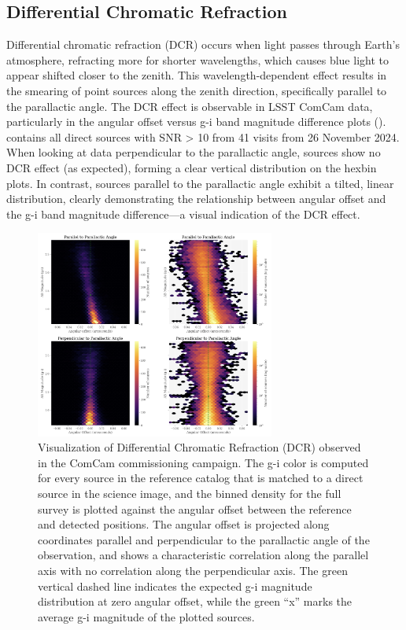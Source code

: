 \subsection{Differential Chromatic Refraction}
\label{sec:diffeerential_chromatic_refraction}

Differential chromatic refraction (DCR) occurs when light passes through Earth’s atmosphere, refracting more for shorter wavelengths, which causes blue light to appear shifted closer to the zenith. This wavelength-dependent effect results in the smearing of point sources along the zenith direction, specifically parallel to the parallactic angle. The DCR effect is observable in LSST ComCam data, particularly in the angular offset versus g-i band magnitude difference plots ().  contains all direct sources with SNR > 10 from 41 visits from 26 November 2024. When looking at data perpendicular to the parallactic angle, sources show no DCR effect (as expected), forming a clear vertical distribution on the hexbin plots. In contrast, sources parallel to the parallactic angle exhibit a tilted, linear distribution, clearly demonstrating the relationship between angular offset and the g-i band magnitude difference—a visual indication of the DCR effect.

\begin{figure}
  \centering
  \includegraphics[width=0.7\textwidth]{dcr_figures/dcr_plot1.png}
  \caption{Visualization of Differential Chromatic Refraction (DCR) observed in the ComCam commissioning campaign. The g-i color is computed for every source in the reference catalog that is matched to a direct source in the science image, and the binned density for the full survey is plotted against the angular offset between the reference and detected positions. The angular offset is projected along coordinates parallel and perpendicular to the parallactic angle of the observation, and shows a characteristic correlation along the parallel axis with no correlation along the perpendicular axis. The green vertical dashed line indicates the expected g-i magnitude distribution at zero angular offset, while the green ``x'' marks the average g-i magnitude of the plotted sources.}
  \label{fig:dcr}
\end{figure}

